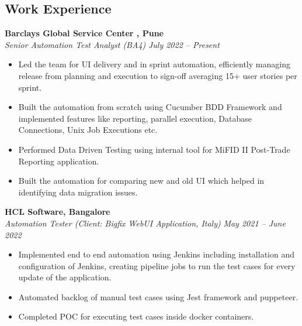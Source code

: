 \documentclass[margin,line]{resume}
\begin{document}
\begin{resume}
    \section{\mysidestyle Work Experience}
    \textbf{Barclays Global Service Center , Pune}\\
        \textsl{Senior Automation Test Analyst (BA4)} \hfill \textsl{July 2022 -- Present}\vspace{0mm}
        
        \begin{itemize}
            \item Led the team for UI delivery and in sprint automation, efficiently managing release from planning and execution to sign-off averaging 15+ user stories per sprint. %
            \item Built the automation from scratch using Cucumber BDD Framework and implemented features like reporting, parallel execution, Database Connections, Unix Job Executions etc.
            \item Performed Data Driven Testing using internal tool for MiFID II Post-Trade Reporting application.
            \item Built the automation for comparing new and old UI which helped in identifying data migration issues.
        \end{itemize}
    \textbf{HCL Software, Bangalore}\\
           \textsl{Automation Tester (Client: Bigfix WebUI Application, Italy)} \hfill \textsl{May 2021 -- June 2022} \vspace{1mm}%
    \begin{itemize}
            \item Implemented end to end automation using Jenkins including installation and configuration of Jenkins, creating pipeline jobs to run the test cases for every update of the application.
            \item Automated backlog of manual test cases using Jest framework and puppeteer.
           \item Completed POC for executing test cases inside docker containers.
        \end{itemize}


\end{resume}
\end{document}
